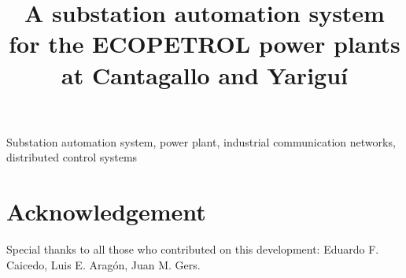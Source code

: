 \documentclass[10pt,conference,compsocconf]{IEEEtran}
\newcommand{\ecopetrol}{\textsf{ECOPETROL}\xspace}
\begin{document}
\title{A substation automation system for the \ecopetrol power plants at Cantagallo and Yariguí}

\author{%
\and
{}
\and
{}
}

\maketitle



\begin{IEEEkeywords}
Substation automation system, power plant, industrial communication networks, distributed control systems
\end{IEEEkeywords}

\IEEEpeerreviewmaketitle







\section*{Acknowledgement} Special thanks to all those who contributed on this development: Eduardo F. Caicedo, Luis E. Aragón, Juan M. Gers.



\end{document}
